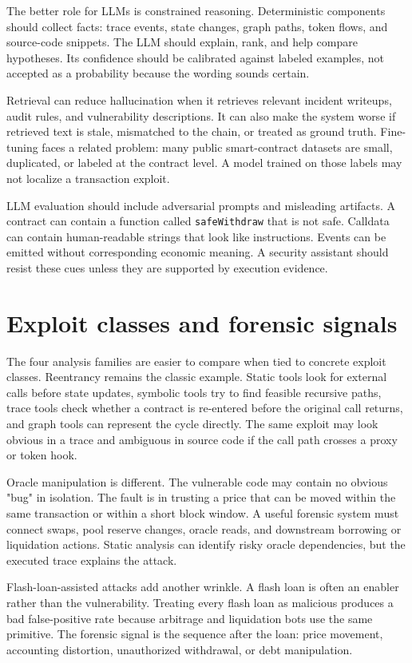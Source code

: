\documentclass[conference]{IEEEtran}
\begin{document}
The better role for LLMs is constrained reasoning. Deterministic components should collect facts: trace events, state changes, graph paths, token flows, and source-code snippets. The LLM should explain, rank, and help compare hypotheses. Its confidence should be calibrated against labeled examples, not accepted as a probability because the wording sounds certain.

Retrieval can reduce hallucination when it retrieves relevant incident writeups, audit rules, and vulnerability descriptions. It can also make the system worse if retrieved text is stale, mismatched to the chain, or treated as ground truth. Fine-tuning faces a related problem: many public smart-contract datasets are small, duplicated, or labeled at the contract level. A model trained on those labels may not localize a transaction exploit.

LLM evaluation should include adversarial prompts and misleading artifacts. A contract can contain a function called \texttt{safeWithdraw} that is not safe. Calldata can contain human-readable strings that look like instructions. Events can be emitted without corresponding economic meaning. A security assistant should resist these cues unless they are supported by execution evidence.

\section{Exploit classes and forensic signals}

The four analysis families are easier to compare when tied to concrete exploit classes. Reentrancy remains the classic example. Static tools look for external calls before state updates, symbolic tools try to find feasible recursive paths, trace tools check whether a contract is re-entered before the original call returns, and graph tools can represent the cycle directly. The same exploit may look obvious in a trace and ambiguous in source code if the call path crosses a proxy or token hook.

Oracle manipulation is different. The vulnerable code may contain no obvious "bug" in isolation. The fault is in trusting a price that can be moved within the same transaction or within a short block window. A useful forensic system must connect swaps, pool reserve changes, oracle reads, and downstream borrowing or liquidation actions. Static analysis can identify risky oracle dependencies, but the executed trace explains the attack.

Flash-loan-assisted attacks add another wrinkle. A flash loan is often an enabler rather than the vulnerability. Treating every flash loan as malicious produces a bad false-positive rate because arbitrage and liquidation bots use the same primitive. The forensic signal is the sequence after the loan: price movement, accounting distortion, unauthorized withdrawal, or debt manipulation.
\end{document}
